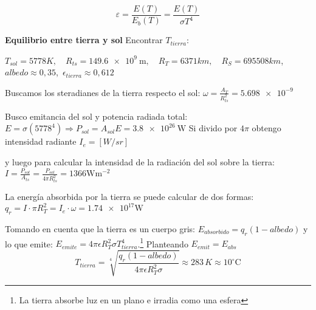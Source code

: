\[ 
\varepsilon = \frac{E(T)}{E_b(T)} = \frac{E(T)}{\sigma T^4}
\]

{\bf Equilibrio entre tierra y sol} Encontrar $T_{tierra}$:

$T_{sol}=5778K, \quad R_{ts}=\SI{149,6e9}{\meter}, \quad R_T=6371 km,\quad R_S=695508km$, $albedo\approx0,35$, $\, \epsilon_{tierra} \approx 0,612$

Buscamos los steradianes de la tierra respecto el sol: $\omega=\frac{A_T}{R_{ts}^2}=\num{5,698e-9}$

Busco emitancia del sol y potencia radiada total:
$E=\sigma (5778^4) \Rightarrow P_{sol}=A_{sol}E=\SI{3,8e26}{\watt}$ Si divido por $4\pi$ obtengo intensidad radiante $I_e=[W/sr]$

y luego para calcular la intensidad de la radiación del sol sobre la tierra:
$I=\frac{P_{sol}}{A_{ts}}=\frac{P_{sol}}{4\pi R_{ts}^2}=1366\si{\watt \meter^{-2}}$

La energía absorbida por la tierra se puede calcular de dos formas:
$q_r=I\cdot \pi R_T^2=I_e\cdot \omega=\num{1,74e17}\si{\watt} $

Tomando en cuenta que la tierra es un cuerpo gris: 
$E_{absorbido}=q_r(1-albedo)$ y lo que emite: $E_{emite}=4\pi \epsilon R_T^2 \sigma T_{tierra}^4$.\footnote{La tierra absorbe luz en un plano e irradia como una esfera} Planteando $E_{emit}=E_{abs}$
\[ T_{tierra} = \sqrt[4]{\frac{q_r(1-albedo)}{4\pi \epsilon R_T^2 \sigma}}\approx 283\, K \approx 10^\circ \textrm{C}\]


